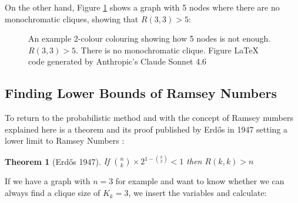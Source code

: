 \documentclass[12pt, a4paper]{article}   %
\newtheorem{theorem}{Theorem}
\begin{document}
On the other hand, Figure \ref{fig:ramsey33-k5} shows a graph with 5 nodes where there are no monochromatic cliques, showing that \( R(3,3) > 5 \):

\begin{figure}[H]
\centering
{}
\caption{An example 2-colour colouring showing how 5 nodes is not enough. \( R(3,3) > 5 \). There is no monochromatic clique. Figure LaTeX code generated by Anthropic's Claude Sonnet 4.6}
\label{fig:ramsey33-k5}
\end{figure}

\subsection{Finding Lower Bounds of Ramsey Numbers}

To return to the probabilistic method and with the concept of Ramsey numbers explained here is a theorem and its proof published by Erdős in 1947 setting a lower limit to Ramsey Numbers \autocite{erdosRemarksTheoryGraphs1947} \autocite{alonProbabilisticMethod2008}:

\begin{theorem}[Erdős 1947] \label{thm:erdos-1947}
    If \( \binom{n}{k} \times 2^{1-\binom{k}{2}} < 1 \) then \( R(k,k) > n \)
\end{theorem}    

If we have a graph with \(n=3\) for example and want to know whether we can always find a clique size of \(K_k = 3\), we insert the variables and calculate:
\end{document}
